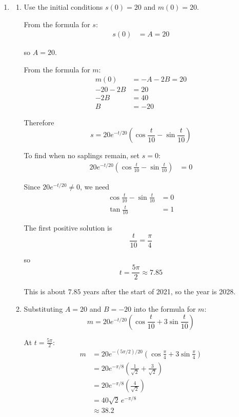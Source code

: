 \documentclass[leqno]{article}
\begin{document}
\begin{enumerate}[
  label=\textbf{\arabic*.},
  leftmargin=*,
  topsep=0pt,
  partopsep=0pt,
  parsep=0pt
]
\begin{djsSolution}
\begin{enumerate}[label=\textbf{(\alph*)}]
  Hence a general solution for the number of mature trees is
  \[
  m=e^{-t/20}\left[(-A-2B)\cos\frac{t}{10}+(2A-B)\sin\frac{t}{10}\right]
  \]

  \item \begin{enumerate}[label=(\roman*)]
    \item Use the initial conditions $s(0)=20$ and $m(0)=20$.

    From the formula for $s$:
    \begin{align*}
    s(0)&=A=20
    \end{align*}

    so $A=20$.

    From the formula for $m$:
    \begin{align*}
    m(0)&=-A-2B=20 \\
    -20-2B&=20 \\
    -2B&=40 \\
    B&=-20
    \end{align*}

    Therefore
    \[
    s=20e^{-t/20}\left(\cos\frac{t}{10}-\sin\frac{t}{10}\right)
    \]

    To find when no saplings remain, set $s=0$:
    \begin{align*}
    20e^{-t/20}\left(\cos\frac{t}{10}-\sin\frac{t}{10}\right)&=0
    \end{align*}

    Since $20e^{-t/20}\neq 0$, we need
    \begin{align*}
    \cos\frac{t}{10}-\sin\frac{t}{10}&=0 \\
    \tan\frac{t}{10}&=1
    \end{align*}

    The first positive solution is
    \[
    \frac{t}{10}=\frac{\pi}{4}
    \]

    so
    \[
    t=\frac{5\pi}{2}\approx 7.85
    \]

    This is about $7.85$ years after the start of 2021, so the year is 2028.

    \item Substituting $A=20$ and $B=-20$ into the formula for $m$:
    \[
    m=20e^{-t/20}\left(\cos\frac{t}{10}+3\sin\frac{t}{10}\right)
    \]

    At $t=\frac{5\pi}{2}$:
    \begin{align*}
    m
    &= 20e^{-(5\pi/2)/20}\left(\cos\frac{\pi}{4}+3\sin\frac{\pi}{4}\right) \\
    &= 20e^{-\pi/8}\left(\frac{1}{\sqrt{2}}+\frac{3}{\sqrt{2}}\right) \\
    &= 20e^{-\pi/8}\left(\frac{4}{\sqrt{2}}\right) \\
    &= 40\sqrt{2}\,e^{-\pi/8} \\
    &\approx 38.2
    \end{align*}


\end{enumerate}
\end{enumerate}
\end{djsSolution}
\end{enumerate}
\end{document}

